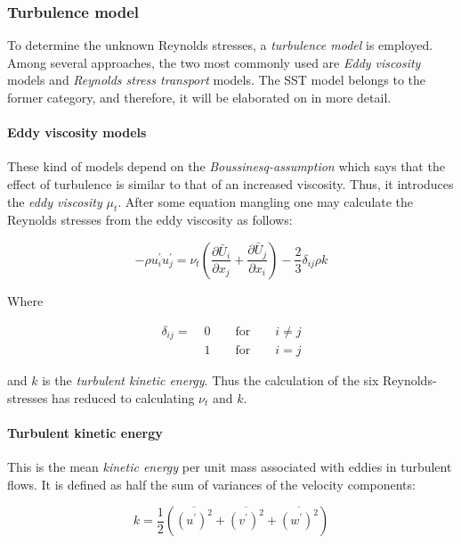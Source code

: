 \subsubsection{Turbulence model}
To determine the unknown Reynolds stresses, a \textit{turbulence model} is
employed. Among several approaches, the two most commonly used are \textit{Eddy
viscosity} models and \textit{Reynolds stress transport} models. The SST model
belongs to the former category, and therefore, it will be elaborated on in more
detail.

\paragraph{Eddy viscosity models}
These kind of models depend on the \textit{Boussinesq-assumption} which says
that the effect of turbulence is similar to that of an increased viscosity.
Thus, it introduces the \textit{eddy viscosity} $\mu_{t}$. After some equation
mangling one may calculate the Reynolds stresses from the eddy viscosity as
follows:

\begin{equation}
    - \rho u_{i}^{\prime} u_{j}^{\prime} =
    \nu_{t} (\frac{\partial \bar U_{i}}{\partial x_{j}} +
    \frac{\partial \bar U_{j}}{\partial x_{i}}) -
    \frac{2}{3} \delta_{ij} \rho k
    \label{eq:boussinesq}
\end{equation}

\noindent Where

\begin{align*}
    \delta_{ij} = \; &0 \qquad \text{for} \qquad i \neq j \\
    &1 \qquad \text{for} \qquad i = j
\end{align*}

\noindent and $k$ is the \textit{turbulent kinetic energy}. Thus the calculation
of the six Reynolds-stresses has reduced to calculating $\nu_{t}$ and $k$.
\cite{leschziner2015statistical}

\paragraph{Turbulent kinetic energy}
This is the mean \textit{kinetic energy} per unit mass associated with eddies
in turbulent flows. It is defined as half the sum of variances of the velocity
components:

\begin{equation}
    k = \frac{1}{2} \left( 
    \overline{(u^{\prime})^2} +
    \overline{(v^{\prime})^2} +
    \overline{(w^{\prime})^2}
    \right)
\end{equation}









